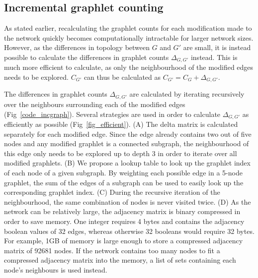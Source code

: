 \subsection*{Incremental graphlet counting}
As stated earlier, recalculating the graphlet counts for each modification made to the network quickly becomes computationally intractable for larger network sizes. However, as the differences in topology between $G$ and $G'$ are small, it is instead possible to calculate the differences in graphlet counts $\Delta_{G, G'}$ instead. This is much more efficient to calculate, as only the neighbourhood of the modified edges needs to be explored. $C_{G'}$ can thus be calculated as $C_{G'} = C_G + \Delta_{G,G'}$.


The differences in graphlet counts $\Delta_{G, G'}$ are calculated by iterating recursively over the neighbours surrounding each of the modified edges (Fig~\ref{code_incgraph}). Several strategies are used in order to calculate $\Delta_{G,G'}$ as efficiently as possible (Fig~\ref{fig_efficient}).
(A) The delta matrix is calculated separately for each modified edge. Since the edge already contains two out of five nodes and any modified graphlet is a connected subgraph, the neighbourhood of this edge only needs to be explored up to depth 3 in order to iterate over all modified graphlets. 
(B) We propose a lookup table to look up the graphlet index of each node of a given subgraph. By weighting each possible edge in a 5-node graphlet, the sum of the edges of a subgraph can be used to easily look up the corresponding graphlet index.
(C) During the recursive iteration of the neighbourhood, the same combination of nodes is never visited twice.
(D) As the network can be relatively large, the adjacency matrix is binary compressed in order to save memory. One integer requires 4 bytes and contains the adjacency boolean values of 32 edges, whereas otherwise 32 booleans would require 32 bytes. For example, 1GB of memory is large enough to store a compressed adjacency matrix of 92681 nodes. If the network contains too many nodes to fit a compressed adjacency matrix into the memory, a list of sets containing each node's neighbours is used instead.


